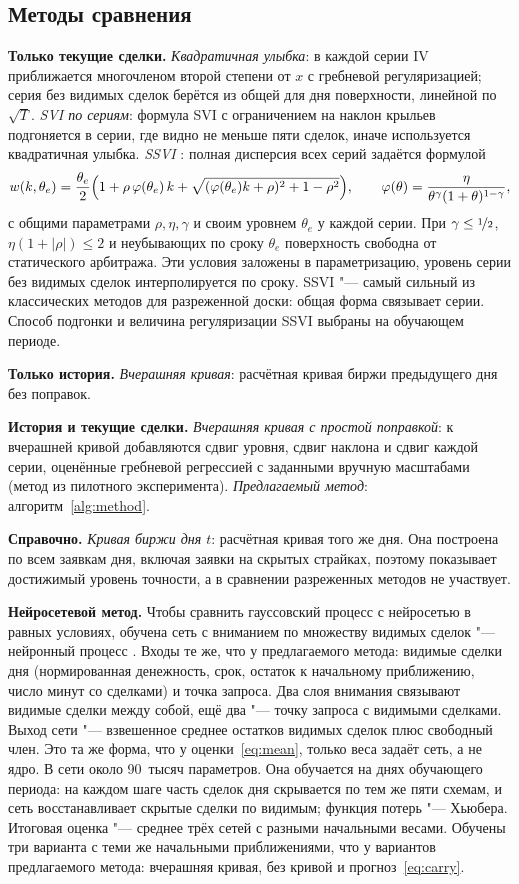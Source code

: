 \documentclass{article}
\begin{document}
\subsection{Методы сравнения}

\textbf{Только текущие сделки.} \emph{Квадратичная улыбка}: в каждой серии IV приближается многочленом второй степени от $x$ с гребневой регуляризацией; серия без видимых сделок берётся из общей для дня поверхности, линейной по $\sqrt{T}$. \emph{SVI по сериям}: формула SVI с ограничением на наклон крыльев подгоняется в серии, где видно не меньше пяти сделок, иначе используется квадратичная улыбка. \emph{SSVI} \citep{gatheral2014arbitrage}: полная дисперсия всех серий задаётся формулой
\[
w(k,\theta_e)=\frac{\theta_e}{2}\Bigl(1+\rho\,\varphi(\theta_e)\,k+\sqrt{(\varphi(\theta_e)k+\rho)^2+1-\rho^2}\Bigr),\qquad \varphi(\theta)=\frac{\eta}{\theta^{\gamma}(1+\theta)^{1-\gamma}},
\]
с общими параметрами $\rho,\eta,\gamma$ и своим уровнем $\theta_e$ у каждой серии. При $\gamma\le\nicefrac12$, $\eta(1+|\rho|)\le 2$ и неубывающих по сроку $\theta_e$ поверхность свободна от статического арбитража. Эти условия заложены в параметризацию, уровень серии без видимых сделок интерполируется по сроку. SSVI "--- самый сильный из классических методов для разреженной доски: общая форма связывает серии. Способ подгонки и величина регуляризации SSVI выбраны на обучающем периоде.

\textbf{Только история.} \emph{Вчерашняя кривая}: расчётная кривая биржи предыдущего дня без поправок.

\textbf{История и текущие сделки.} \emph{Вчерашняя кривая с простой поправкой}: к вчерашней кривой добавляются сдвиг уровня, сдвиг наклона и сдвиг каждой серии, оценённые гребневой регрессией с заданными вручную масштабами (метод из пилотного эксперимента). \emph{Предлагаемый метод}: алгоритм~\ref{alg:method}.

\textbf{Справочно.} \emph{Кривая биржи дня $t$}: расчётная кривая того же дня. Она построена по всем заявкам дня, включая заявки на скрытых страйках, поэтому показывает достижимый уровень точности, а в сравнении разреженных методов не участвует.

\textbf{Нейросетевой метод.} Чтобы сравнить гауссовский процесс с нейросетью в равных условиях, обучена сеть с вниманием по множеству видимых сделок "--- нейронный процесс \citep{garnelo2018conditional,kim2019attentive}. Входы те же, что у предлагаемого метода: видимые сделки дня (нормированная денежность, срок, остаток к начальному приближению, число минут со сделками) и точка запроса. Два слоя внимания связывают видимые сделки между собой, ещё два "--- точку запроса с видимыми сделками. Выход сети "--- взвешенное среднее остатков видимых сделок плюс свободный член. Это та же форма, что у оценки~\eqref{eq:mean}, только веса задаёт сеть, а не ядро. В сети около 90~тысяч параметров. Она обучается на днях обучающего периода: на каждом шаге часть сделок дня скрывается по тем же пяти схемам, и сеть восстанавливает скрытые сделки по видимым; функция потерь "--- Хьюбера. Итоговая оценка "--- среднее трёх сетей с разными начальными весами. Обучены три варианта с теми же начальными приближениями, что у вариантов предлагаемого метода: вчерашняя кривая, без кривой и прогноз~\eqref{eq:carry}.
\end{document}
